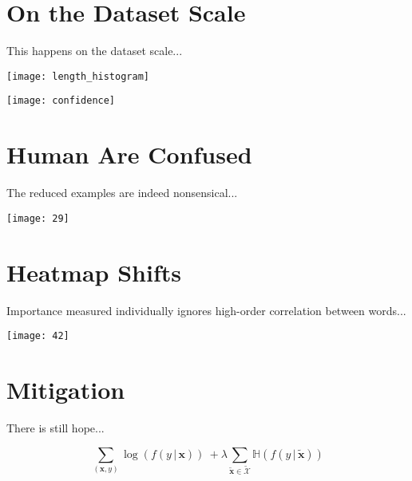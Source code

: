 \documentclass[a0,portrait]{a0poster}
\newcommand{\mb}[1]{\boldsymbol{\mathbf{#1}}}
\newcommand{\g}{\, | \,}
\begin{document}
\begin{multicols}{2}
\vfill\null
\columnbreak

\section*{On the Dataset Scale}
This happens on the dataset scale...

\begin{center}\vspace{0.6cm}
\texttt{[image: length\_histogram]}
\end{center}

\begin{center}
\texttt{[image: confidence]}
\end{center}\vspace{0.6cm}


\section*{Human Are Confused}
The reduced examples are indeed nonsensical...

\begin{center}\vspace{0.6cm}
\texttt{[image: 29]}
\end{center}\vspace{0.6cm}


\section*{Heatmap Shifts}
Importance measured individually ignores high-order correlation between words...

\begin{center}\vspace{0.6cm}
\texttt{[image: 42]}
\end{center}\vspace{0.6cm}


\section*{Mitigation}
There is still hope...

\begin{center}
\begin{equation}
\sum_{(\mb{x}, y)}\log(f(y \g \mb{x})) \
+ \lambda\sum_{\tilde{\mb{x}}\in \tilde{\mathcal{X}}}
\mathbb{H}\left(f(y \g \tilde{\mb{x}})\right) \nonumber
\end{equation}
\end{center}


\end{multicols}
\end{document}

